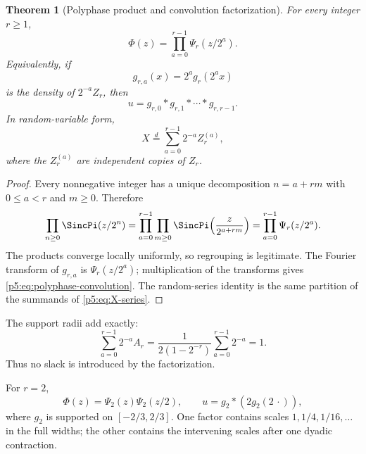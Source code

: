 \documentclass[11pt]{article}
\newtheorem{theorem}{Theorem}[section]
\theoremstyle{definition}
\theoremstyle{remark}
\begin{document}
\begin{theorem}[Polyphase product and convolution factorization]
\label{p5:thm:polyphase-main}
For every integer $r\ge1$,
\begin{equation}
 \boxed{\displaystyle
 \Phi(z)=\prod_{a=0}^{r-1}\Psi_r(z/2^a).}                  \label{p5:eq:polyphase-product}
\end{equation}
Equivalently, if
\begin{equation}
 g_{r,a}(x)=2^a g_r(2^a x)                                 \label{p5:eq:scaled-gr}
\end{equation}
 is the density of $2^{-a}Z_r$, then
\begin{equation}
 \boxed{\displaystyle
 u=g_{r,0}*g_{r,1}*\cdots*g_{r,r-1}.}                       \label{p5:eq:polyphase-convolution}
\end{equation}
In random-variable form,
\begin{equation}
 X\overset{d}=\sum_{a=0}^{r-1}2^{-a}Z_r^{(a)},              \label{p5:eq:polyphase-random}
\end{equation}
where the $Z_r^{(a)}$ are independent copies of $Z_r$.
\end{theorem}

\begin{proof}
Every nonnegative integer has a unique decomposition $n=a+rm$ with
$0\le a<r$ and $m\ge0$.  Therefore
\[
 \prod_{n\ge0}\SincPi(z/2^n)
 =\prod_{a=0}^{r-1}\prod_{m\ge0}
   \SincPi\!\left(\frac{z}{2^{a+rm}}\right)
 =\prod_{a=0}^{r-1}\Psi_r(z/2^a).
\]
The products converge locally uniformly, so regrouping is legitimate.  The
Fourier transform of $g_{r,a}$ is $\Psi_r(z/2^a)$; multiplication of the
transforms gives \eqref{p5:eq:polyphase-convolution}.  The random-series identity
is the same partition of the summands of \eqref{p5:eq:X-series}.
\end{proof}

\begin{remark}
The support radii add exactly:
\begin{equation}
 \sum_{a=0}^{r-1}2^{-a}A_r
 =\frac{1}{2(1-2^{-r})}\sum_{a=0}^{r-1}2^{-a}=1.            \label{p5:eq:support-adds}
\end{equation}
Thus no slack is introduced by the factorization.
\end{remark}

\begin{example}
For $r=2$,
\begin{equation}
 \Phi(z)=\Psi_2(z)\Psi_2(z/2),
 \qquad
 u=g_2*(2g_2(2\,\cdot)),                                   \label{p5:eq:r2-factorization}
\end{equation}
where $g_2$ is supported on $[-2/3,2/3]$.  One factor contains scales
$1,1/4,1/16,\ldots$ in the full widths; the other contains the intervening
scales after one dyadic contraction.
\end{example}
\end{document}
